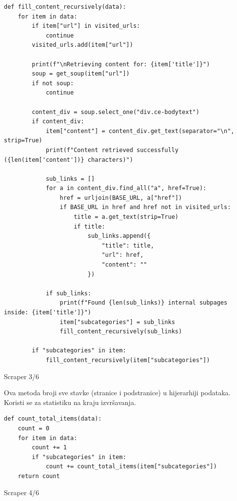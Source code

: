 \documentclass[]{foi}
\begin{document}
\begin{longlisting}
\begin{verbatim}
def fill_content_recursively(data):
    for item in data:
        if item["url"] in visited_urls:
            continue
        visited_urls.add(item["url"])

        print(f"\nRetrieving content for: {item['title']}")
        soup = get_soup(item["url"])
        if not soup:
            continue

        content_div = soup.select_one("div.ce-bodytext")
        if content_div:
            item["content"] = content_div.get_text(separator="\n", strip=True)
            print(f"Content retrieved successfully ({len(item['content'])} characters)")

            sub_links = []
            for a in content_div.find_all("a", href=True):
                href = urljoin(BASE_URL, a["href"])
                if BASE_URL in href and href not in visited_urls:
                    title = a.get_text(strip=True)
                    if title:
                        sub_links.append({
                            "title": title,
                            "url": href,
                            "content": ""
                        })

            if sub_links:
                print(f"Found {len(sub_links)} internal subpages inside: {item['title']}")
                item["subcategories"] = sub_links
                fill_content_recursively(sub_links)

        if "subcategories" in item:
            fill_content_recursively(item["subcategories"])
\end{verbatim}
\caption{Scraper 3/6}
\label{lst:scraper3}
\end{longlisting}

Ova metoda broji sve stavke (stranice i podstranice) u hijerarhiji podataka. Koristi se za statistiku na kraju izvršavanja.  

\begin{longlisting}
\begin{verbatim}
def count_total_items(data):
    count = 0
    for item in data:
        count += 1
        if "subcategories" in item:
            count += count_total_items(item["subcategories"])
    return count
\end{verbatim}
\caption{Scraper 4/6}
\label{lst:scraper4}
\end{longlisting}
\end{document}
